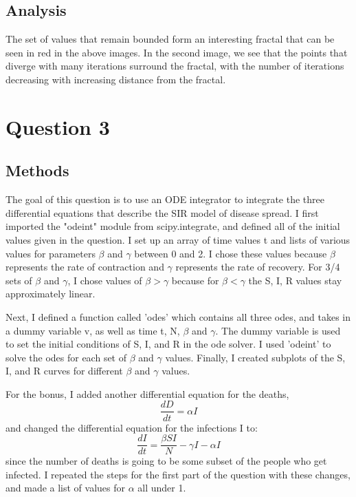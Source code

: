 \documentclass{article}
\begin{document}
\subsection*{Analysis}
The set of values that remain bounded form an interesting fractal that can be seen in red in the above images. In the second image, we see that the points that diverge with many iterations surround the fractal, with the number of iterations decreasing with increasing distance from the fractal. 

\section*{Question 3}
\subsection*{Methods}
The goal of this question is to use an ODE integrator to integrate the three differential equations that describe the SIR model of disease spread. I first imported the "odeint" module from scipy.integrate, and defined all of the initial values given in the question. I set up an array of time values t and lists of various values for parameters $\beta$ and $\gamma$ between 0 and 2. I chose these values because $\beta$ represents the rate of contraction and $\gamma$ represents the rate of recovery. For 3/4 sets of $\beta$ and  $\gamma$, I chose values of  $\beta > \gamma$ because for $\beta < \gamma$ the S, I, R values stay approximately linear. 

Next, I defined a function called 'odes' which contains all three odes, and takes in a dummy variable v, as well as time t, N, $\beta$ and $\gamma$. The dummy variable is used to set the initial conditions of S, I, and R in the ode solver. I used 'odeint' to solve the odes for each set of $\beta$ and $\gamma$ values. Finally, I created subplots of the S, I, and R curves for different $\beta$ and $\gamma$ values. 

For the bonus, I added another differential equation for the deaths, 
\begin{equation}
\frac{d D}{d t}=\alpha I
\end{equation}
and changed the differential equation for the infections I to:
\begin{equation}
\frac{d I}{d t}=\frac{\beta S I}{N}-\gamma I - \alpha I
\end{equation}
since the number of deaths is going to be some subset of the people who get infected. I repeated the steps for the first part of the question with these changes, and made a list of values for $\alpha$ all under 1. 
\end{document}
